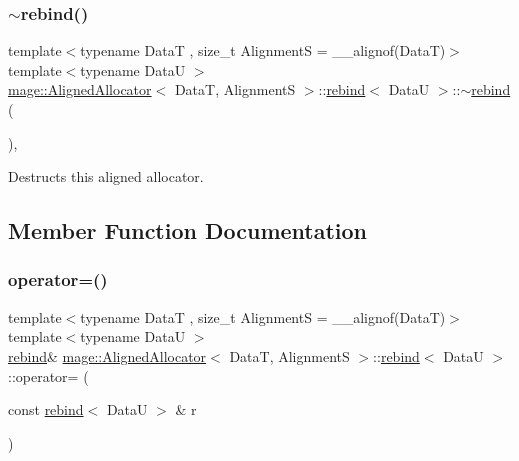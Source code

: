 \subsubsection{\texorpdfstring{$\sim$rebind()}{~rebind()}}
{\footnotesize\ttfamily template$<$typename DataT , size\+\_\+t AlignmentS = \+\_\+\+\_\+alignof(\+Data\+T)$>$ \\
template$<$typename DataU $>$ \\
\hyperlink{structmage_1_1_aligned_allocator}{mage\+::\+Aligned\+Allocator}$<$ DataT, AlignmentS $>$\+::\hyperlink{structmage_1_1_aligned_allocator_1_1rebind}{rebind}$<$ DataU $>$\+::$\sim$\hyperlink{structmage_1_1_aligned_allocator_1_1rebind}{rebind} (\begin{DoxyParamCaption}{ }\end{DoxyParamCaption})\hspace{0.3cm}{\ttfamily [private]}, {\ttfamily [delete]}}

Destructs this aligned allocator. 

\subsection{Member Function Documentation}
\hypertarget{structmage_1_1_aligned_allocator_1_1rebind_a32b474cf072c192715654d74b639c9f7}{}\label{structmage_1_1_aligned_allocator_1_1rebind_a32b474cf072c192715654d74b639c9f7} 
\subsubsection{\texorpdfstring{operator=()}{operator=()}\hspace{0.1cm}{\footnotesize\ttfamily [1/2]}}
{\footnotesize\ttfamily template$<$typename DataT , size\+\_\+t AlignmentS = \+\_\+\+\_\+alignof(\+Data\+T)$>$ \\
template$<$typename DataU $>$ \\
\hyperlink{structmage_1_1_aligned_allocator_1_1rebind}{rebind}\& \hyperlink{structmage_1_1_aligned_allocator}{mage\+::\+Aligned\+Allocator}$<$ DataT, AlignmentS $>$\+::\hyperlink{structmage_1_1_aligned_allocator_1_1rebind}{rebind}$<$ DataU $>$\+::operator= (\begin{DoxyParamCaption}\item[{const \hyperlink{structmage_1_1_aligned_allocator_1_1rebind}{rebind}$<$ DataU $>$ \&}]{r }\end{DoxyParamCaption})\hspace{0.3cm}{\ttfamily [delete]}}

